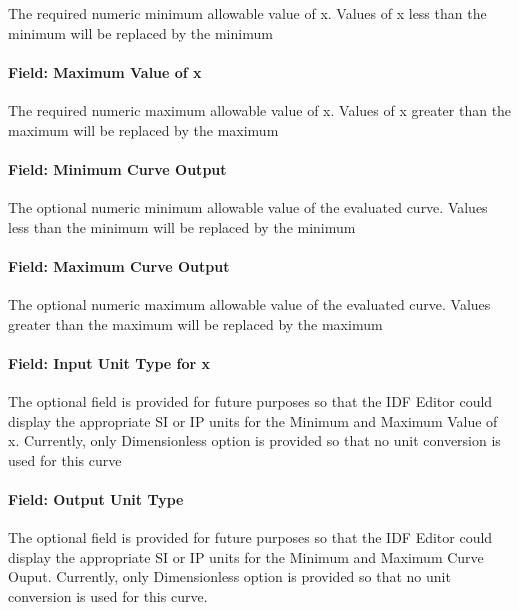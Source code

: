 The required numeric minimum allowable value of x. Values of x less than the minimum will be replaced by the minimum

\paragraph{Field: Maximum Value of x}\label{field-maximum-value-of-x-18}

The required numeric maximum allowable value of x. Values of x greater than the maximum will be replaced by the maximum

\paragraph{Field: Minimum Curve Output}\label{field-minimum-curve-output-17}

The optional numeric minimum allowable value of the evaluated curve. Values less than the minimum will be replaced by the minimum

\paragraph{Field: Maximum Curve Output}\label{field-maximum-curve-output-16}

The optional numeric maximum allowable value of the evaluated curve. Values greater than the maximum will be replaced by the maximum

\paragraph{Field: Input Unit Type for x}\label{field-input-unit-type-for-x-17}

The optional field is provided for future purposes so that the IDF Editor could display the appropriate SI or IP units for the Minimum and Maximum Value of x. Currently, only Dimensionless option is provided so that no unit conversion is used for this curve

\paragraph{Field: Output Unit Type}\label{field-output-unit-type-16}

The optional field is provided for future purposes so that the IDF Editor could display the appropriate SI or IP units for the Minimum and Maximum Curve Ouput. Currently, only Dimensionless option is provided so that no unit conversion is used for this curve.

